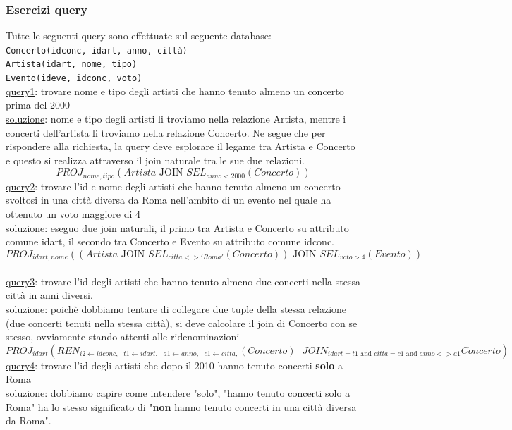 \subsubsection{Esercizi query}
Tutte le seguenti query sono effettuate sul seguente database:\\
\texttt{Concerto(idconc, idart, anno, città)}\\
\texttt{Artista(idart, nome, tipo)}\\
\texttt{Evento(ideve, idconc, voto)}\medskip\\
\underline{query1}: trovare nome e tipo degli artisti che hanno tenuto almeno un concerto prima del 2000\\
\underline{soluzione}: nome e tipo degli artisti li troviamo nella relazione Artista, mentre i concerti dell'artista li troviamo nella relazione Concerto. 
Ne segue che per rispondere alla richiesta, la query deve esplorare il legame tra Artista e Concerto e questo si realizza attraverso il join naturale tra le sue due relazioni.\\
$$ PROJ_{nome,tipo}(Artista \text{ JOIN }SEL_{anno<2000}(Concerto))$$
\underline{query2}: trovare l'id e nome degli artisti che hanno tenuto almeno un concerto svoltosi in una città diversa da Roma nell'ambito di un evento nel quale ha ottenuto un voto maggiore di 4\\
\underline{soluzione}: eseguo due join naturali, il primo tra Artista e Concerto su attributo comune idart, il secondo tra Concerto e Evento su attributo comune idconc.\\
$$ PROJ_{idart,nome}((Artista \text{ JOIN }SEL_{citta<>'Roma'}(Concerto)) \text{ JOIN }SEL_{voto>4}(Evento)) $$\\
\underline{query3}: trovare l'id degli artisti che hanno tenuto almeno due concerti nella stessa città in anni diversi.\\
\underline{soluzione}: poichè dobbiamo tentare di collegare due tuple della stessa relazione (due concerti tenuti nella stessa città), si deve calcolare il join di Concerto con se stesso, ovviamente stando attenti alle ridenominazioni\\
$$PROJ_{idart}(REN_{i2 \leftarrow idconc, \text{ }t1\leftarrow idart,\text{ }a1\leftarrow anno,\text{ }c1\leftarrow citta,}(Concerto) \text{ }JOIN_{idart=t1 \text{ and }citta=c1 \text{ and }anno<>a1} Concerto)$$
\underline{query4}: trovare l'id degli artisti che dopo il 2010 hanno tenuto concerti \textbf{solo} a Roma\\
\underline{soluzione}: dobbiamo capire come intendere "solo", "hanno tenuto concerti solo a Roma" ha lo stesso significato di "\textbf{non} hanno tenuto concerti in una città diversa da Roma".\\
